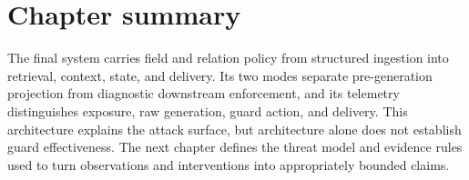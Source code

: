 \section{Chapter summary}

The final system carries field and relation policy from structured ingestion into retrieval, context, state, and delivery. Its two modes separate pre-generation projection from diagnostic downstream enforcement, and its telemetry distinguishes exposure, raw generation, guard action, and delivery. This architecture explains the attack surface, but architecture alone does not establish guard effectiveness. The next chapter defines the threat model and evidence rules used to turn observations and interventions into appropriately bounded claims.
